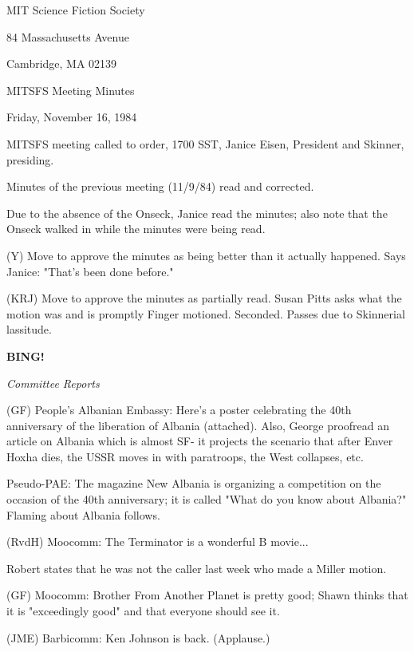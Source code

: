 \documentclass[12pt]{article}
\newcommand{\bing}{{\bf BING!} }
\newcommand{\goto}[1]{\bing \vskip 12pt \centerline{{\em{#1}}}}
\begin{document}
\begin{center}

MIT Science Fiction Society 

84 Massachusetts Avenue

Cambridge, MA 02139

\vspace{12pt}

MITSFS Meeting Minutes 

Friday, November 16, 1984

\end{center}
 
\vspace{18pt}

\setlength{\parskip}{6pt}

\noindent
MITSFS meeting called to order, 1700 SST,
Janice Eisen, President and Skinner, presiding.

Minutes of the previous meeting (11/9/84) read and corrected.

Due to the absence of the Onseck, Janice read the minutes; also note that the Onseck walked in while the minutes were being read.

(Y) Move to approve the minutes as being better than it actually happened. Says Janice: "That's been done before."

(KRJ) Move to approve the minutes as partially read. Susan Pitts asks what the motion was and is promptly Finger motioned. Seconded. Passes due to Skinnerial lassitude.

\goto{Committee Reports}

(GF) People's Albanian Embassy: Here's a poster celebrating the 40th anniversary of the liberation of Albania (attached). Also, George proofread an article on Albania which is almost SF- it projects the scenario that after Enver Hoxha dies, the USSR moves in with paratroops, the West collapses, etc.

Pseudo-PAE: The magazine New Albania is organizing a competition on the occasion of the 40th anniversary; it is called "What do you know about Albania?" Flaming about Albania follows.

(RvdH) Moocomm: The Terminator is a wonderful B movie...

Robert states that he was not the caller last week who made a Miller motion.

(GF) Moocomm: Brother From Another Planet is pretty good; Shawn thinks that it is "exceedingly good" and that everyone should see it.

(JME) Barbicomm: Ken Johnson is back. (Applause.)
\end{document}
